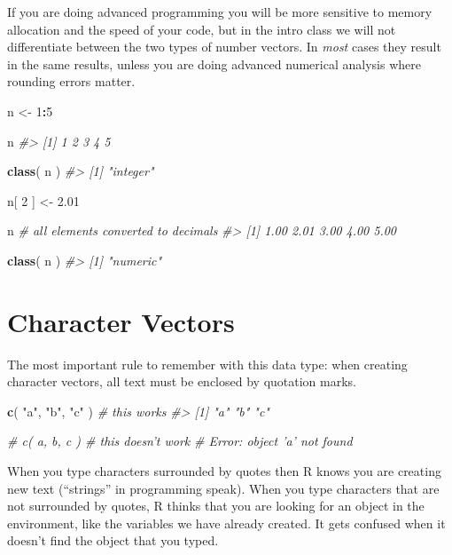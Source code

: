 \documentclass[]{book}
\newenvironment{Shaded}{\begin{snugshade}}{\end{snugshade}}
\newcommand{\CommentTok}[1]{\textcolor[rgb]{0.56,0.35,0.01}{\textit{#1}}}
\newcommand{\DecValTok}[1]{\textcolor[rgb]{0.00,0.00,0.81}{#1}}
\newcommand{\FloatTok}[1]{\textcolor[rgb]{0.00,0.00,0.81}{#1}}
\newcommand{\KeywordTok}[1]{\textcolor[rgb]{0.13,0.29,0.53}{\textbf{#1}}}
\newcommand{\NormalTok}[1]{#1}
\newcommand{\OperatorTok}[1]{\textcolor[rgb]{0.81,0.36,0.00}{\textbf{#1}}}
\newcommand{\StringTok}[1]{\textcolor[rgb]{0.31,0.60,0.02}{#1}}
\theoremstyle{definition}
\theoremstyle{definition}
\theoremstyle{definition}
\theoremstyle{remark}
\begin{document}
If you are doing advanced programming you will be more sensitive to
memory allocation and the speed of your code, but in the intro class we
will not differentiate between the two types of number vectors. In
\emph{most} cases they result in the same results, unless you are doing
advanced numerical analysis where rounding errors matter.

\begin{Shaded}
\begin{Highlighting}[]

\NormalTok{n <-}\StringTok{ }\DecValTok{1}\OperatorTok{:}\DecValTok{5}

\NormalTok{n}
\CommentTok{#> [1] 1 2 3 4 5}

\KeywordTok{class}\NormalTok{( n )}
\CommentTok{#> [1] "integer"}

\NormalTok{n[ }\DecValTok{2}\NormalTok{ ] <-}\StringTok{ }\FloatTok{2.01}

\NormalTok{n  }\CommentTok{# all elements converted to decimals}
\CommentTok{#> [1] 1.00 2.01 3.00 4.00 5.00}

\KeywordTok{class}\NormalTok{( n )}
\CommentTok{#> [1] "numeric"}
\end{Highlighting}
\end{Shaded}

\hypertarget{character-vectors}{%
\section{Character Vectors}\label{character-vectors}}

The most important rule to remember with this data type: when creating
character vectors, all text must be enclosed by quotation marks.

\begin{Shaded}
\begin{Highlighting}[]

\KeywordTok{c}\NormalTok{( }\StringTok{"a"}\NormalTok{, }\StringTok{"b"}\NormalTok{, }\StringTok{"c"}\NormalTok{ )   }\CommentTok{# this works}
\CommentTok{#> [1] "a" "b" "c"}

\CommentTok{# c( a, b, c )       # this doesn't work}
\CommentTok{# Error: object 'a' not found}
\end{Highlighting}
\end{Shaded}

When you type characters surrounded by quotes then R knows you are
creating new text (``strings'' in programming speak). When you type
characters that are not surrounded by quotes, R thinks that you are
looking for an object in the environment, like the variables we have
already created. It gets confused when it doesn't find the object that
you typed.
\end{document}
